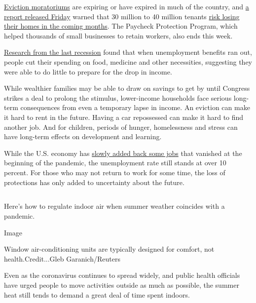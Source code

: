 \href{https://www.nytimes.com/2020/08/07/business/economy/housing-economy-eviction-renters.html}{Eviction
moratoriums} are expiring or have expired in much of the country, and
\href{https://nlihc.org/sites/default/files/The_Eviction_Crisis_080720.pdf}{a
report released Friday} warned that 30 million to 40 million tenants
\href{https://www.nytimes.com/2020/08/07/business/economy/housing-economy-eviction-renters.html}{risk
losing their homes in the coming months}. The Paycheck Protection
Program, which helped thousands of small businesses to retain workers,
also ends this week.

\href{https://www.aeaweb.org/articles?id=10.1257/aer.20170537}{Research
from the last recession} found that when unemployment benefits ran out,
people cut their spending on food, medicine and other necessities,
suggesting they were able to do little to prepare for the drop in
income.

While wealthier families may be able to draw on savings to get by until
Congress strikes a deal to prolong the stimulus, lower-income households
face serious long-term consequences from even a temporary lapse in
income. An eviction can make it hard to rent in the future. Having a car
repossessed can make it hard to find another job. And for children,
periods of hunger, homelessness and stress can have long-term effects on
development and learning.

While the U.S. economy has
\href{https://www.nytimes.com/live/2020/08/07/business/stock-market-today-coronavirus}{slowly
added back some jobs} that vanished at the beginning of the pandemic,
the unemployment rate still stands at over 10 percent. For those who may
not return to work for some time, the loss of protections has only added
to uncertainty about the future.

\hypertarget{section-6}{%
\subsection{}\label{section-6}}

Here's how to regulate indoor air when summer weather coincides with a
pandemic.

Image

Window air-conditioning units are typically designed for comfort, not
health.Credit...Gleb Garanich/Reuters

Even as the coronavirus continues to spread widely, and public health
officials have urged people to move activities outside as much as
possible, the summer heat still tends to demand a great deal of time
spent indoors.


